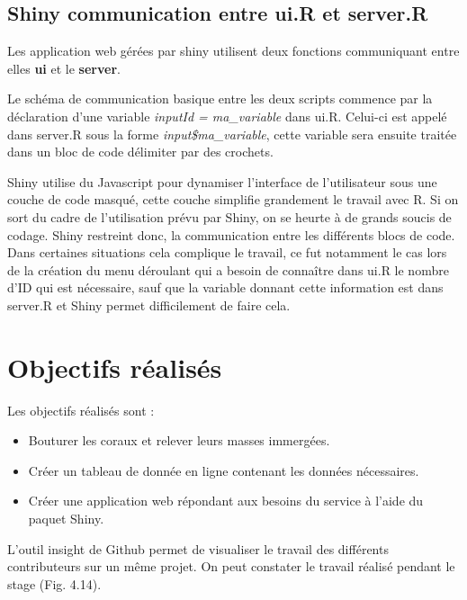 \documentclass[]{report}
\begin{document}
\subsection{Shiny communication entre ui.R et
server.R}\label{shiny-communication-entre-ui.r-et-server.r}

Les application web gérées par shiny utilisent deux fonctions
communiquant entre elles \textbf{ui} et le \textbf{server}.

Le schéma de communication basique entre les deux scripts commence par
la déclaration d'une variable \emph{inputId = ma\_variable} dans ui.R.
Celui-ci est appelé dans server.R sous la forme
\emph{input\$ma\_variable}, cette variable sera ensuite traitée dans un
bloc de code délimiter par des crochets.

Shiny utilise du Javascript pour dynamiser l'interface de l'utilisateur
sous une couche de code masqué, cette couche simplifie grandement le
travail avec R. Si on sort du cadre de l'utilisation prévu par Shiny, on
se heurte à de grands soucis de codage. Shiny restreint donc, la
communication entre les différents blocs de code. Dans certaines
situations cela complique le travail, ce fut notamment le cas lors de la
création du menu déroulant qui a besoin de connaître dans ui.R le nombre
d'ID qui est nécessaire, sauf que la variable donnant cette information
est dans server.R et Shiny permet difficilement de faire cela.

\section{Objectifs réalisés}\label{objectifs-realises}

Les objectifs réalisés sont :

\begin{itemize}
\item
  Bouturer les coraux et relever leurs masses immergées.
\item
  Créer un tableau de donnée en ligne contenant les données nécessaires.
\item
  Créer une application web répondant aux besoins du service à l'aide du
  paquet Shiny.
\end{itemize}

L'outil insight de Github permet de visualiser le travail des différents
contributeurs sur un même projet. On peut constater le travail réalisé
pendant le stage (Fig. 4.14).
\end{document}
